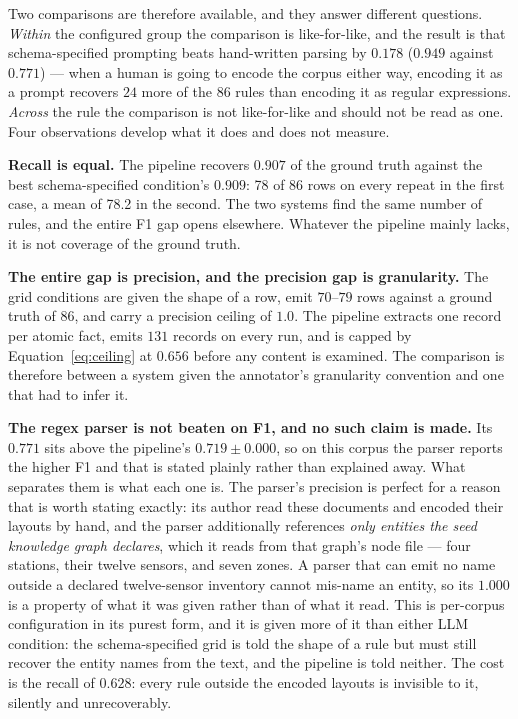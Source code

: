 \documentclass[11pt]{article}
\begin{document}
Two comparisons are therefore available, and they answer different questions.
\emph{Within} the configured group the comparison is like-for-like, and the
result is that schema-specified prompting beats hand-written parsing by
$0.178$ ($0.949$ against $0.771$) --- when a human is going to encode the corpus
either way, encoding it as a prompt recovers $24$ more of the $86$ rules than
encoding it as regular expressions. \emph{Across} the rule the comparison is not
like-for-like and should not be read as one. Four observations develop what it
does and does not measure.

\textbf{Recall is equal.} The pipeline recovers $0.907$ of the ground
truth against the best schema-specified condition's $0.909$: 78 of 86 rows on
every repeat in the first case, a mean of 78.2 in the second. The two systems
find the same number of rules, and the entire F1
gap opens elsewhere. Whatever the pipeline
mainly lacks, it is not coverage of the ground truth.

\textbf{The entire gap is precision, and the precision gap is granularity.} The
grid conditions are given the shape of a row, emit $70$--$79$ rows against a
ground truth of $86$, and carry a precision ceiling of $1.0$. The pipeline
extracts one record per atomic fact, emits $131$ records on every run, and is
capped by Equation~\ref{eq:ceiling} at $0.656$
before any content is examined. The comparison is therefore between a system
given the annotator's granularity convention and one that had to infer it.

\textbf{The regex parser is not beaten on F1, and no such claim is made.} Its
$0.771$ sits above the pipeline's $0.719 \pm 0.000$, so on this corpus the
parser reports the higher F1 and that is stated plainly rather than explained
away. What separates them is what each
one is. The parser's precision is perfect for a reason that is worth stating
exactly: its author read these documents and encoded their layouts by hand, and
the parser additionally references \emph{only entities the seed knowledge graph
declares}, which it reads from that graph's node file --- four stations, their
twelve sensors, and seven zones. A parser that can emit no name outside a
declared twelve-sensor inventory cannot mis-name an entity, so its $1.000$ is a
property of what it was given rather than of what it read. This is per-corpus
configuration in its purest form, and it is given more of it than either LLM
condition: the schema-specified grid is told the shape of a rule but must still
recover the entity names from the text, and the pipeline is told neither. The
cost is the recall of $0.628$: every rule outside the encoded layouts is
invisible to it, silently and unrecoverably.
\end{document}
